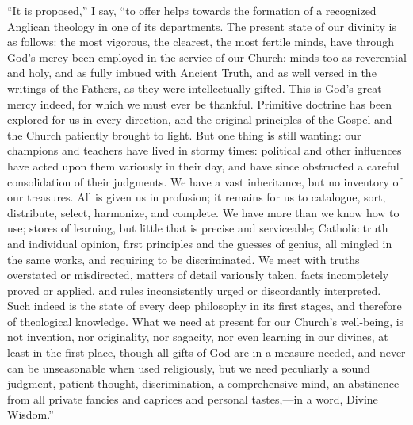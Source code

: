 ``It is proposed,'' I say, ``to offer helps towards the
formation of a recognized Anglican theology in one of its departments.
The present state of our divinity is as follows: the most vigorous, the
clearest, the most fertile minds, have through God's mercy been employed
in the service of our Church: minds too as reverential and holy, and as
fully imbued with Ancient Truth, and as well versed in the writings of
the Fathers, as they were intellectually gifted. This is God's great
mercy indeed, for which we must ever be thankful. Primitive doctrine has been explored for us in every direction, and the original
principles of the Gospel and the Church patiently brought to light. But
one thing is still wanting: our champions and teachers have lived in
stormy times: political and other influences have acted upon them
variously in their day, and have since obstructed a careful
consolidation of their judgments. We have a vast inheritance, but no
inventory of our treasures. All is given us in profusion; it remains for
us to catalogue, sort, distribute, select, harmonize, and complete. We
have more than we know how to use; stores of learning, but little that
is precise and serviceable; Catholic truth and individual opinion, first
principles and the guesses of genius, all mingled in the same works, and
requiring to be discriminated. We meet with truths overstated or
misdirected, matters of detail variously taken, facts incompletely
proved or applied, and rules inconsistently urged or discordantly
interpreted. Such indeed is the state of every deep philosophy in its
first stages, and therefore of theological knowledge. What we need at
present for our Church's well-being, is not invention, nor originality,
nor sagacity, nor even learning in our divines, at least in the first
place, though all gifts of God are in a measure needed, and never can be
unseasonable when used religiously, but we need peculiarly a sound
judgment, patient thought, discrimination, a comprehensive mind, an
abstinence from all private fancies and caprices and personal tastes,—in
a word, Divine Wisdom.''

